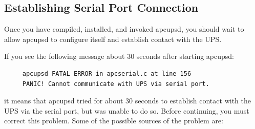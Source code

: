 {{{{{{{\label{Establishing-Serial-Port-Connection}

\subsection*{Establishing Serial Port Connection}

\label{index-Testing_002c-Serial-221}
Once you have compiled, installed, and invoked apcupsd, you should wait to
allow apcupsd to configure itself and establish contact with the UPS.  

If you see the following message about 30 seconds after starting apcupsd: 

\footnotesize
\begin{verbatim}
     apcupsd FATAL ERROR in apcserial.c at line 156
     PANIC! Cannot communicate with UPS via serial port.
\end{verbatim}
\normalsize

it means that apcupsd tried for about 30 seconds to establish contact with the
UPS via the serial port, but was unable to do so. Before continuing, you must
correct this problem. Some of the possible sources of the problem are:  

}}}}}}}
